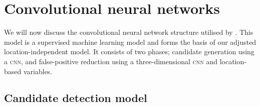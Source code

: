 %
%
%
%
%
%


\section{Convolutional neural networks}\label{litrev-cnn}

We will now discuss the convolutional neural network structure utilised by \cite{GhafoorianM.2017Dml3}. This model is a supervised machine learning model and forms the basis of our adjusted location-independent model. It consists of two phases; candidate generation using a \textsc{cnn}, and false-positive reduction using a three-dimensional \textsc{cnn} and location-based variables.

\subsection*{Candidate detection model}

